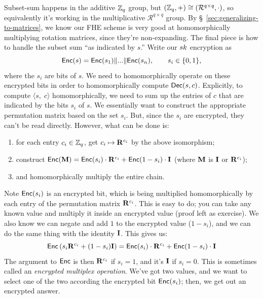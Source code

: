\documentclass[11pt]{article}
\begin{document}
\bigskip

Subset-sum happens in the additive $\mathbb{Z}_q$ group, but $(\mathbb{Z}_q,+) \cong (\mathcal{R}^{q \times q}, \cdot)$, so equivalently it's working in the multiplicative $\mathcal{R}^{q \times q}$ group. By \S~\ref{sec:generalizing-to-matrices}, we know our FHE scheme is very good at homomorphically multiplying rotation matrices, since they're non-expanding. The final piece is how to handle the subset sum ``as indicated by $s$.'' Write our $sk$ encryption as
\begin{equation}
    \label{eq:enc-rotation-mat}
    \mathsf{Enc}(s) = \mathsf{Enc}(s_1) \| ... \|\mathsf{Enc}(s_n), \qquad s_i \in \{0,1\},
\end{equation}
\noindent where the $s_i$ are bits of $s$. We need to homomorphically operate on these encrypted bits in order to homomorphically compute $\mathsf{Dec}(s,c)$. Explicitly, to compute $\langle s, \; c \rangle$ homomorphically, we need to sum up the entries of $c$ that are indicated by the bits $s_i$ of $s$. We essentially want to construct the appropriate permutation matrix based on the set $s_i$. But, since the $s_i$ are encrypted, they can't be read directly. However, what can be done is:
\begin{enumerate}
    \item for each entry $c_i \in \mathbb{Z}_q$, get $c_i \mapsto \mathbf{R}^{c_i}$ by the above isomorphism;
    \item construct $\mathsf{Enc}(\mathbf{M}) = \mathsf{Enc}(s_i) \cdot \mathbf{R}^{c_i} + \mathsf{Enc}(1-s_i)\cdot \mathbf{I}$ \quad (where $\mathbf{M}$ is $\mathbf{I}$ or $\mathbf{R}^{c_i}$);
    \item and homomorphically multiply the entire chain.
\end{enumerate}
\noindent Note $\mathsf{Enc}(s_i)$ is an encrypted bit, which is being multiplied homomorphically by each entry of the permutation matrix $\mathbf{R}^{c_i}$. This is easy to do; you can take any known value and multiply it inside an encrypted value (proof left as exercise). We also know we can negate and add $1$ to the encrypted value ($1-s_i$), and we can do the same thing with the identity $\mathbf{I}$. This gives us:
\begin{equation}
    \mathsf{Enc}\left(s_i\mathbf{R}^{c_i}+(1-s_i)\mathbf{I}\right) = \mathsf{Enc}(s_i) \cdot \mathbf{R}^{c_i} + \mathsf{Enc}(1-s_i)\cdot \mathbf{I}
\end{equation}
\noindent The argument to $\mathsf{Enc}$ is then $\mathbf{R}^{c_i}$ if $s_i = 1$, and it's $\mathbf{I}$ if $s_i = 0$. This is sometimes called an \emph{encrypted multiplex operation}. We've got two values, and we want to select one of the two according the encrypted bit $\mathsf{Enc}(s_i)$; then, we get out an encrypted answer.
\end{document}
